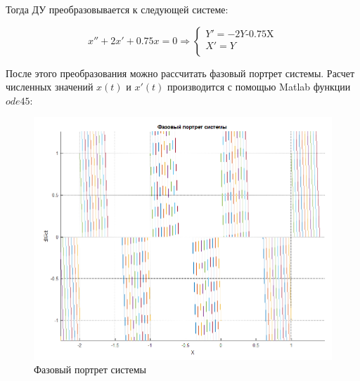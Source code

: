 \documentclass[14pt,a4paper,report]{report}
\begin{document}
Тогда ДУ преобразовывается к следующей системе:

\begin{equation*}
	\text{$x''+2x'+0.75x=0$}
	\Longrightarrow
	\begin{cases}
		\text{$Y'=-2Y$-0.75X} \\
		\text{$X'=Y$} \\
	\end{cases}
\end{equation*}

После этого преобразования можно рассчитать фазовый портрет системы. Расчет численных значений $x(t)$ и $x'(t)$ производится с помощью Matlab функции $ode45$:




\begin{figure}[h!]
	\centering
	\includegraphics[scale = 0.43]{images/odeneg.png}
	\caption{Фазовый портрет системы}
	\label{image:9}
\end{figure}
\end{document}
